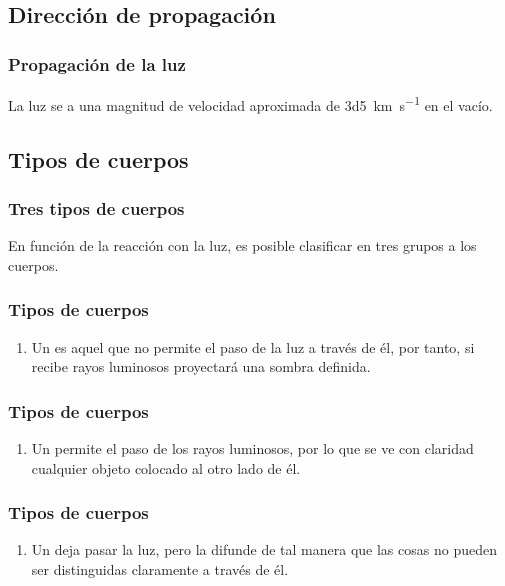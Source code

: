 \documentclass[14pt]{beamer}
\begin{document}
\subsection{Dirección de propagación}

\begin{frame}
\frametitle{Propagación de la luz}
La luz se  a una magnitud de velocidad aproximada de \SI{3d5}{\kilo\meter\per\second} en el vacío.
\end{frame}

\subsection{Tipos de cuerpos}

\begin{frame}
\frametitle{Tres tipos de cuerpos}
En función de la reacción con la luz, es posible clasificar en tres grupos a los cuerpos.
\end{frame}
\begin{frame}
\frametitle{Tipos de cuerpos}
\begin{enumerate}[<+->]
\item Un  es aquel que no permite el paso de la luz a través de él, por tanto, si recibe rayos luminosos proyectará una sombra definida.
\seti
\end{enumerate}
\end{frame}
\begin{frame}
\frametitle{Tipos de cuerpos}
\begin{enumerate}[<+->]
\conti
\item Un  permite el paso de los rayos luminosos, por lo que se ve con claridad cualquier objeto colocado al otro lado de él.
\seti
\end{enumerate}
\end{frame}
\begin{frame}
\frametitle{Tipos de cuerpos}
\begin{enumerate}[<+->]
\conti
\item Un  deja pasar la luz, pero la difunde de tal manera que las cosas no pueden ser distinguidas claramente a través de él.
\end{enumerate}
\end{frame}
\end{document}
